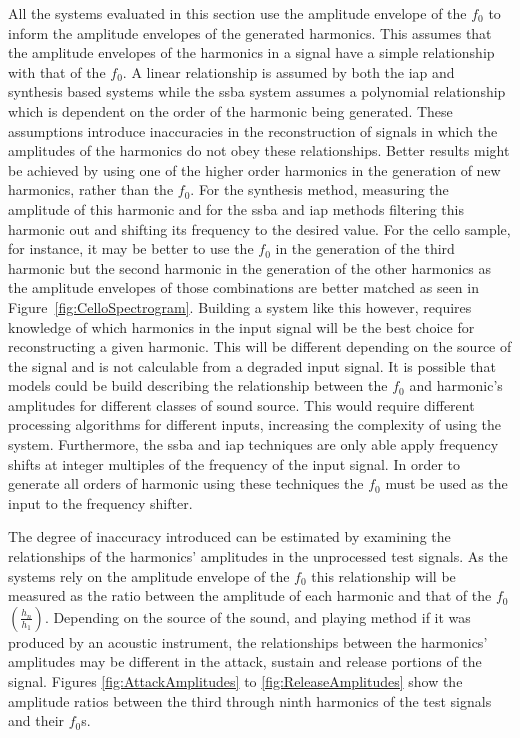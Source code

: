 		All the systems evaluated in this section use the amplitude envelope of the $f_{0}$ to inform the amplitude
		envelopes of the generated harmonics. This assumes that the amplitude envelopes of the harmonics in a
		signal have a simple relationship with that of the $f_{0}$. A linear relationship is assumed by both the
		\acrshort{iap} and synthesis based systems while the \acrshort{ssba} system assumes a polynomial
		relationship which is dependent on the order of the harmonic being generated. These assumptions introduce
		inaccuracies in the reconstruction of signals in which the amplitudes of the harmonics do not obey these
		relationships. Better results might be achieved by using one of the higher order harmonics in the
		generation of new harmonics, rather than the $f_{0}$. For the synthesis method, measuring the amplitude of
		this harmonic and for the \acrshort{ssba} and \acrshort{iap} methods filtering this harmonic out and
		shifting its frequency to the desired value. For the cello sample, for instance, it may be better to use
		the $f_{0}$ in the generation of the third harmonic but the second harmonic in the generation of the other
		harmonics as the amplitude envelopes of those combinations are better matched as seen in
		Figure~\ref{fig:CelloSpectrogram}. Building a system like this however, requires knowledge of which
		harmonics in the input signal will be the best choice for reconstructing a given harmonic. This will be
		different depending on the source of the signal and is not calculable from a degraded input signal. It is
		possible that models could be build describing the relationship between the $f_{0}$ and harmonic's
		amplitudes for different classes of sound source. This would require different processing algorithms for
		different inputs, increasing the complexity of using the system. Furthermore, the \acrshort{ssba} and
		\acrshort{iap} techniques are only able apply frequency shifts at integer multiples of the frequency of the
		input signal. In order to generate all orders of harmonic using these techniques the $f_{0}$ must be used
		as the input to the frequency shifter.
		
		The degree of inaccuracy introduced can be estimated by examining the relationships of the harmonics'
		amplitudes in the unprocessed test signals. As the systems rely on the amplitude envelope of the $f_{0}$
		this relationship will be measured as the ratio between the amplitude of each harmonic and that of the
		$f_{0}$ $\left(\frac{h_{n}}{h_{1}}\right)$. Depending on the source of the sound, and playing method if
		it was produced by an acoustic instrument, the relationships between the harmonics' amplitudes may be
		different in the attack, sustain and release portions of the signal. Figures \ref{fig:AttackAmplitudes} to
		\ref{fig:ReleaseAmplitudes} show the amplitude ratios between the third through ninth harmonics of the test
		signals and their $f_{0}$s.

